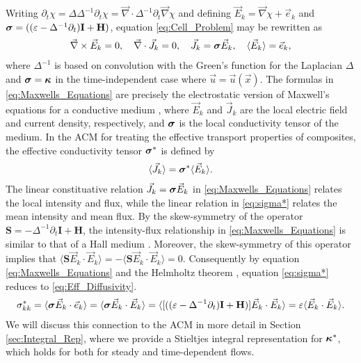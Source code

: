 \documentclass[11pt]{amsart}
\newcommand{\Hb}{\mathbf{H}}
\newcommand{\Ib}{\mathbf{I}}
\newcommand\bsig{\mbox{\boldmath${\sigma}$}}
\newcommand\bkappa{\mbox{\boldmath${\kappa}$}}
\begin{document}
Writing $\partial_t\chi=\Delta\Delta^{-1}\partial_t\chi=\vec{\nabla}\cdot\Delta^{-1}\partial_t\vec{\nabla}\chi$ and defining
$\vec{E}_k=\vec{\nabla}\chi+\vec{e}_k$ and $\bsig=((\varepsilon-\Delta^{-1}\partial_t)\Ib+\Hb)$,
equation \eqref{eq:Cell_Problem} may be rewritten as
\cite{Fannjiang:SIAM_JAM:333}  
%
\begin{align}\label{eq:Maxwells_Equations}  
  \vec{\nabla}\times\vec{E}_k=0, \quad
  \vec{\nabla}\cdot\vec{J}_k=0, \quad  
  \vec{J}_k=\bsig\vec{E}_k,\quad
  \langle\vec{E}_k\rangle=\vec{e}_k,
\end{align}
%
where $\Delta^{-1}$ is based on convolution with the Green's function for
the Laplacian $\Delta$ and $\bsig=\bkappa$ in the time-independent
case where $\vec{u}=\vec{u}(\vec{x})$. The formulas in
\eqref{eq:Maxwells_Equations} are  
precisely the electrostatic version of Maxwell's equations for a
conductive medium \cite{Golden:CMP-473}, where $\vec{E}_k$ and
$\vec{J}_k$ are the local electric field and current density,
respectively, and $\bsig$ is the local conductivity tensor of the
medium. In the ACM for treating the effective transport properties of
composites, the effective conductivity tensor $\bsig^*$ is defined by 
%
\begin{align}\label{eq:sigma*}
  \langle\vec{J}_k\rangle=\bsig^*\langle\vec{E}_k\rangle.
\end{align}
%
The linear constituative relation $\vec{J}_k=\bsig\vec{E}_k$ in
\eqref{eq:Maxwells_Equations} relates the local intensity and flux,
while the linear relation in \eqref{eq:sigma*} relates the mean
intensity and mean flux. By the skew-symmetry of the operator
$\mathbf{S}=-\Delta^{-1}\partial_t\Ib+\Hb$, the intensity-flux relationship in
\eqref{eq:Maxwells_Equations} is similar to
that of a Hall medium \cite{Isichenko:JNS:1991:375}. Moreover, the
skew-symmetry of this operator implies that
$\langle\mathbf{S}\vec{E}_k\cdot\vec{E}_k\rangle=-\langle\mathbf{S}\vec{E}_k\cdot\vec{E}_k\rangle=0$. Consequently
by equation \eqref{eq:Maxwells_Equations} and the Helmholtz theorem
\cite{Denaro:2003:0271}, equation \eqref{eq:sigma*} reduces to
\eqref{eq:Eff_Diffusivity}.    
%
\begin{align}
  \sigma^*_{kk}=\langle\bsig\vec{E}_k\cdot\vec{e}_k\rangle
       =\langle\bsig\vec{E}_k\cdot\vec{E}_k\rangle
       =\langle[((\varepsilon-\Delta^{-1}\partial_t)\Ib+\Hb)]\vec{E}_k\cdot\vec{E}_k\rangle
       =\varepsilon\langle\vec{E}_k\cdot\vec{E}_k\rangle.
\end{align}
%
We will discuss this connection to the ACM in more detail in Section
\ref{sec:Integral_Rep}, where we provide a Stieltjes integral
representation for $\bkappa^*$, which holds for both for steady and
time-dependent flows. 
\end{document}
